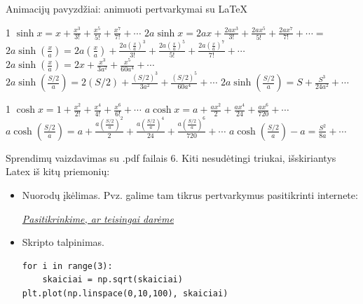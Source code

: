 \documentclass{beamer}
\begin{document}
 \begin{frame}[fragile]{Animacijų pavyzdžiai: animuoti pertvarkymai su LaTeX}
\begin{animateinline}[controls, poster = last, loop, begin={
  \begin{tikzpicture}
  \useasboundingbox (0,-0.5) rectangle (\textwidth, 0.75);
}, end={\end{tikzpicture}}]{1}
$\sinh x = x + \frac {x^3} {3!} + \frac {x^5} {5!} + \frac {x^7} {7!} +\cdots $
\newframe
$2a\sinh x = 2ax + \frac {2ax^3} {3!} + \frac {2ax^5} {5!} + \frac {2ax^7} {7!} +\cdots =$
\newframe
$2a\sinh \left(\frac{x}{a}\right) = 2a\left(\frac{x}{a}\right) + \frac {2a\left(\frac{x}{a}\right)^3} {3!} + \frac {2a\left(\frac{x}{a}\right)^5} {5!} + \frac {2a\left(\frac{x}{a}\right)^7} {7!} +\cdots$
\newframe
$2a\sinh \left(\frac{x}{a}\right) = 2x + \frac{x^3}{3a^2} + \frac{x^5}{60a^4} +\cdots$
\newframe
$2a\sinh \left(\frac{S/2}{a}\right) = 2(S/2) + \frac{(S/2)^3}{3a^2} + \frac{(S/2)^5}{60a^4} +\cdots$
\newframe
$2a\sinh \left(\frac{S/2}{a}\right) = S+ \frac{S^3}{24a^2} +\cdots$
\end{animateinline}

\begin{animateinline}[controls, poster = last, loop, begin={
  \begin{tikzpicture}
  \useasboundingbox (0,-0.5) rectangle (\textwidth, 0.75);
}, end={\end{tikzpicture}}]{1}
$\cosh x = 1 + \frac {x^2} {2!} + \frac {x^4} {4!} + \frac {x^6} {6!} + \cdots$
\newframe
$a\cosh x = a + \frac {ax^2} {2} + \frac {ax^4} {24} + \frac {ax^6} {720} + \cdots$
\newframe
$a\cosh \left(\frac{S/2}{a}\right)  = a + \frac {a\left(\frac{S/2}{a}\right) ^2} {2} + \frac {a\left(\frac{S/2}{a}\right) ^4} {24} + \frac {a\left(\frac{S/2}{a}\right) ^6} {720} + \cdots$
\newframe
$a\cosh \left(\frac{S/2}{a}\right)-a  = \frac{S^2}{8a} + \cdots$
\end{animateinline}
\end{frame}

\begin{frame}[fragile]{Sprendimų vaizdavimas su .pdf failais}
6. Kiti nesudėtingi triukai, išskiriantys Latex iš kitų priemonių:
\begin{itemize}
\item Nuorodų įkėlimas. Pvz. galime tam tikrus pertvarkymus pasitikrinti internete:

\href{https://www.wolframalpha.com/input/?i=(y+or+not(z)+implies+z+and+not(x+and+y))+or+(x+equivalent+z)}{\textit{Pasitikrinkime, ar teisingai darėme}}
\item Skripto talpinimas.
\begin{verbatim}
for i in range(3): 
	skaiciai = np.sqrt(skaiciai)
plt.plot(np.linspace(0,10,100), skaiciai)
\end{verbatim}
\end{itemize}
\end{frame}
\end{document}
